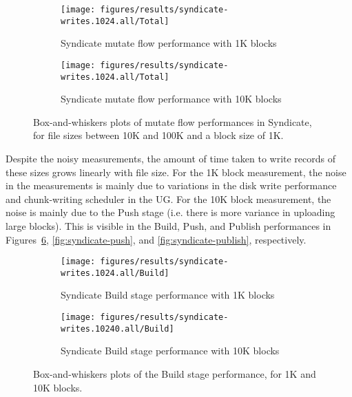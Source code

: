 \begin{figure}[htp!]
   \centering
   \begin{subfigure}[b]{.8\textwidth}
      \texttt{[image: figures/results/syndicate-writes.1024.all/Total]}
      \label{fig:syndicate-read-discover-1k}
      \caption{Syndicate mutate flow performance with 1K blocks}
   \end{subfigure}
   \begin{subfigure}[b]{.8\textwidth}
      \texttt{[image: figures/results/syndicate-writes.1024.all/Total]}
      \label{fig:syndicate-read-acquire-1k}
      \caption{Syndicate mutate flow performance with 10K blocks}
   \end{subfigure}
   \caption{Box-and-whiskers plots of mutate flow performances in
   Syndicate, for file sizes between 10K and 100K and a block size of 1K.}
   \label{fig:syndicate-writes-total}
\end{figure}

Despite the noisy measurements, the amount of time taken to write records of
these sizes grows linearly with file size.  For the 1K block measurement, the noise in the
measurements is mainly due to variations in the disk write performance and
chunk-writing scheduler in the UG.  For the 10K block measurement, the noise is
mainly due to the Push stage (i.e. there is more variance in uploading large
blocks).  This is visible in the Build, Push, and Publish
performances in Figures~\ref{fig:syndicate-build}, \ref{fig:syndicate-push}, and
\ref{fig:syndicate-publish}, respectively.

\begin{figure}[htp!]
   \centering
   \begin{subfigure}[b]{.8\textwidth}
      \texttt{[image: figures/results/syndicate-writes.1024.all/Build]}
      \label{fig:syndicate-build-1k}
      \caption{Syndicate Build stage performance with 1K blocks}
   \end{subfigure}
   \begin{subfigure}[b]{.8\textwidth}
      \texttt{[image: figures/results/syndicate-writes.10240.all/Build]}
      \label{fig:syndicate-build-10k}
      \caption{Syndicate Build stage performance with 10K blocks}
   \end{subfigure}
   \caption{Box-and-whiskers plots of the Build stage performance, for 1K and
   10K blocks.}
   \label{fig:syndicate-build}
\end{figure}

